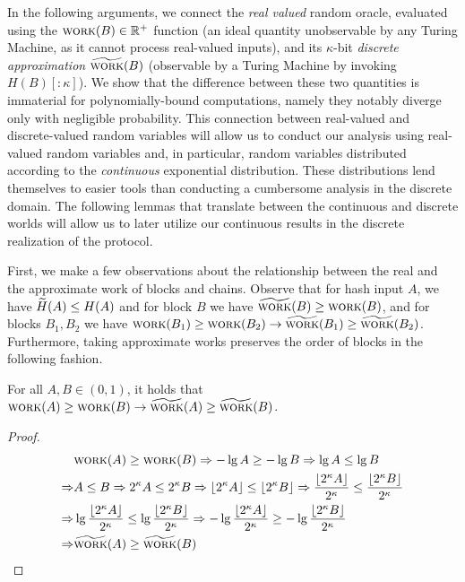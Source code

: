 In the following arguments, we connect the \emph{real valued}
random oracle, evaluated using the $\textsc{work}(B) \in \mathbb{R}^+$
function (an ideal quantity
unobservable by any Turing Machine, as it cannot process real-valued
inputs), and its $\kappa$-bit \emph{discrete approximation} $\widetilde{\textsc{work}}(B)$ (observable by
a Turing Machine by invoking $H(B)[{:}{\kappa}]$). We show that the
difference between these two quantities is immaterial for polynomially-bound
computations, namely they notably diverge only with negligible probability.
This connection between real-valued and discrete-valued
random variables will allow us to conduct our analysis using real-valued
random variables and, in particular, random variables distributed according to the
\emph{continuous} exponential distribution. These distributions lend themselves
to easier tools than conducting a cumbersome analysis in the discrete domain.
The following lemmas that translate between the continuous and discrete worlds
will allow us to later utilize our continuous results in the discrete
realization of the protocol.

First, we make a few observations about the relationship
between the real and the approximate work of blocks and chains.
Observe that for hash input $A$, we have
$\widetilde{H}(A) \leq H(A)$ and for block $B$ we have
$\widetilde{\textsc{work}}(B) \geq \textsc{work}(B)$,
and for blocks $B_1, B_2$ we have
$\textsc{work}(B_1) \geq \textsc{work}(B_2) \rightarrow \widetilde{\textsc{work}}(B_1) \geq \widetilde{\textsc{work}}(B_2)$.
Furthermore, taking approximate works preserves
the order of blocks in the following fashion.

\begin{lemma}\label{lemma:awork-rounding}
  For all $A, B \in (0, 1)$, it holds that
  $\textsc{work}(A) \geq \textsc{work}(B) \rightarrow \widetilde{\textsc{work}}(A) \geq \widetilde{\textsc{work}}(B)$.
\end{lemma}
\begin{proof}
  \begin{align*}
                &\textsc{work}(A) \geq \textsc{work}(B) \Rightarrow -\lg A \geq -\lg B \Rightarrow \lg A \leq \lg B\\
    \Rightarrow &A \leq B \Rightarrow 2^\kappa A \leq 2^\kappa B \Rightarrow \lfloor 2^\kappa A \rfloor \leq \lfloor 2^\kappa B \rfloor \Rightarrow \frac{\lfloor 2^\kappa A \rfloor}{2^\kappa} \leq \frac{\lfloor 2^\kappa B \rfloor}{2^\kappa}\\
    \Rightarrow &\lg \frac{\lfloor 2^\kappa A \rfloor}{2^\kappa} \leq \lg \frac{\lfloor 2^\kappa B \rfloor}{2^\kappa} \Rightarrow -\lg \frac{\lfloor 2^\kappa A \rfloor}{2^\kappa} \geq -\lg \frac{\lfloor 2^\kappa B \rfloor}{2^\kappa}\\
    \Rightarrow &\widetilde{\textsc{work}}(A) \geq \widetilde{\textsc{work}}(B)
  \end{align*}
  \Qed
\end{proof}

